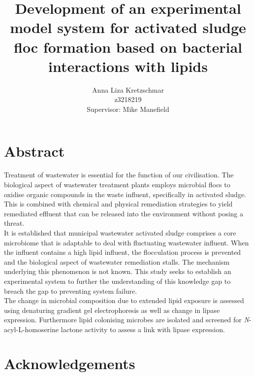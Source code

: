 \documentclass[11pt]{article}
\title{\textbf{Development of an experimental model system for activated sludge floc formation based on bacterial interactions with lipids}}
\author{Anna Liza Kretzschmar\\
        z3218219\\
        Supervisor: Mike Manefield}
\date{}
\begin{document}
\maketitle
\thispagestyle{empty}
\pagestyle{headings}
\setcounter{page}{1}

\section{Abstract}
Treatment of wastewater is essential for the function of our civilisation. The biological aspect of wastewater treatment plants employs microbial flocs to oxidise organic compounds in the waste influent, specifically in activated sludge. This is combined with chemical and physical remediation strategies to yield remediated effluent that can be released into the environment without posing a  threat. \\

It is established that municipal wastewater activated sludge comprises a core microbiome that is adaptable to deal with fluctuating wastewater influent. When the influent contains a high lipid influent, the flocculation process is prevented and the biological aspect of wastewater remediation stalls. The mechanism underlying this phenomenon is not known. This study seeks to establish an experimental system to further the understanding of this knowledge gap to breach the gap to preventing system failure. \\

The change in microbial composition due to extended lipid exposure is assessed using denaturing gradient gel electrophoresis as well as change in lipase expression. Furthermore lipid colonising microbes are isolated and screened for \emph{N}-acyl-L-homoserine lactone activity to assess a link with lipase expression. 
\newpage
\section{Acknowledgements}
\thispagestyle{empty}


\end{document}
